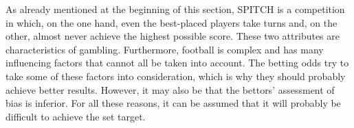 As already mentioned at the beginning of this section, SPITCH is a competition in which, on the one hand, even the best-placed players take turns and, on the other, almost never achieve the highest possible score. These two attributes are characteristics of gambling. Furthermore, football is complex and has many influencing factors that cannot all be taken into account. The betting odds try to take some of these factors into consideration, which is why they should probably achieve better results. However, it may also be that the bettors' assessment of bias is inferior. For all these reasons, it can be assumed that it will probably be difficult to achieve the set target. 
